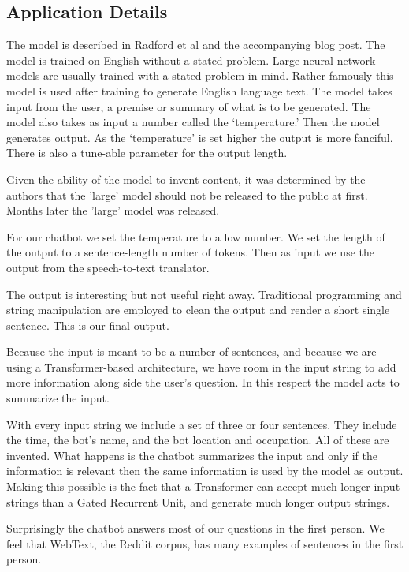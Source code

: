 \subsection{Application Details}
The model is described in Radford et al \cite{radford2019language} and the accompanying blog post. The model is trained on English without a stated problem. Large neural network models are usually trained with a stated problem in mind. Rather famously this model is used after training to generate English language text. The model takes input from the user, a premise or summary of what is to be generated. The model also takes as input a number called the `temperature.' Then the model generates output. As the `temperature' is set higher the output is more fanciful. There is also a tune-able parameter for the output length. 

Given the ability of the model to invent content, it was determined by the authors that the 'large' model should not be released to the public at first. Months later the 'large' model was released. 

For our chatbot we set the temperature to a low number. We set the length of the output to a sentence-length number of tokens. Then as input we use the output from the speech-to-text translator.

The output is interesting but not useful right away. Traditional programming and string manipulation are employed to clean the output and render a short single sentence. This is our final output.

Because the input is meant to be a number of sentences, and because we are using a Transformer-based architecture, we have room in the input string to add more information along side the user's question. In this respect the model acts to summarize the input. 

With every input string we include a set of three or four sentences. They include the time, the bot's name, and the bot location and occupation. All of these are invented. What happens is the chatbot summarizes the input and only if the information is relevant then the same information is used by the model as output. Making this possible is the fact that a Transformer can accept much longer input strings than a Gated Recurrent Unit, and generate much longer output strings.

Surprisingly the chatbot answers most of our questions in the first person. We feel that WebText, the Reddit corpus, has many examples of sentences in the first person.

